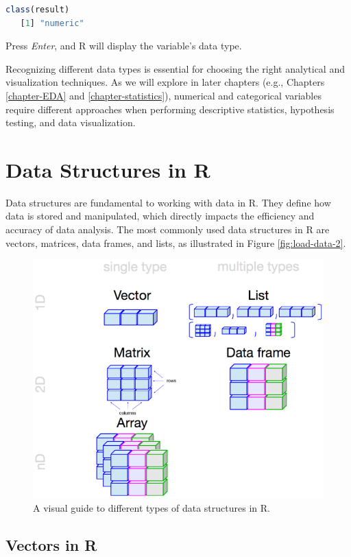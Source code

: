 \documentclass[
]{book}
\theoremstyle{definition}
\theoremstyle{definition}
\theoremstyle{definition}
\theoremstyle{definition}
\theoremstyle{remark}
\begin{document}
\begin{lstlisting}[language=R]
class(result)
   [1] "numeric"
\end{lstlisting}

Press \emph{Enter}, and R will display the variable's data type.

Recognizing different data types is essential for choosing the right analytical and visualization techniques. As we will explore in later chapters (e.g., Chapters \ref{chapter-EDA} and \ref{chapter-statistics}), numerical and categorical variables require different approaches when performing descriptive statistics, hypothesis testing, and data visualization.

\section{Data Structures in R}\label{data-structures-in-r}

Data structures are fundamental to working with data in R. They define how data is stored and manipulated, which directly impacts the efficiency and accuracy of data analysis. The most commonly used data structures in R are vectors, matrices, data frames, and lists, as illustrated in Figure \ref{fig:load-data-2}.

\begin{figure}

{\centering \includegraphics[width=0.6\linewidth]{images/R-objects} 

}

\caption{A visual guide to different types of data structures in R.}\label{fig:R-objects}
\end{figure}

\subsection*{Vectors in R}\label{vectors-in-r}
\end{document}
